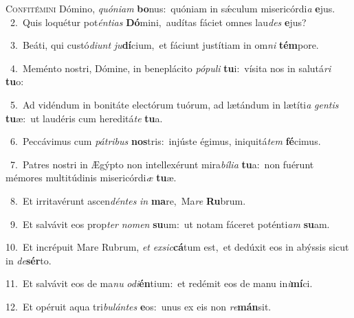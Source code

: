 \lettrine{\initial\textcolor{\initialcolor}{C}}{onfitémini} Dómino, \textit{quón}\-\textit{i}\textit{am} \textbf{bo}\-nus:~\star quóniam in sǽculum misericórdi\textit{a} \textbf{e}\-jus.\\
{\numbfont\textcolor{\numbcolor}{~2.}}~Quis loquétur pot\-\textit{én}\-\textit{ti}\textit{as} \textbf{Dó}\-mini,~\star audítas fáciet omnes lau\textit{des} \textbf{e}\-jus?\par
{\numbfont\textcolor{\numbcolor}{~3.}}~Beáti, qui custó\-\textit{di}\-\textit{unt} \textit{ju}\-\textbf{dí}cium,~\star et fáciunt justítiam in om\textit{ni} \textbf{tém}\-pore.\par
{\numbfont\textcolor{\numbcolor}{~4.}}~Meménto nostri, Dómine, in beneplácito \textit{pó}\-\textit{pu}\textit{li} \textbf{tu}\-i:~\star vísita nos in salutá\textit{ri} \textbf{tu}\-o:\par
{\numbfont\textcolor{\numbcolor}{~5.}}~Ad vidéndum in bonitáte electórum tuórum, ad lætándum in lætíti\textit{a} \textit{gen}\-\textit{tis} \textbf{tu}\-æ:~\star ut laudéris cum hereditá\textit{te} \textbf{tu}\-a.\par
{\numbfont\textcolor{\numbcolor}{~6.}}~Peccávimus cum \textit{pá}\-\textit{tri}\textit{bus} \textbf{nos}\-tris:~\star injúste égimus, iniquitá\textit{tem} \textbf{fé}\-cimus.\par
{\numbfont\textcolor{\numbcolor}{~7.}}~Patres nostri in Ægýpto non intellexérunt mira\-\textit{bí}\-\textit{li}\textit{a} \textbf{tu}\-a:~\star non fuérunt mémores multitúdinis misericórdi\textit{æ} \textbf{tu}\-æ.\par
{\numbfont\textcolor{\numbcolor}{~8.}}~Et irritavérunt ascen\-\textit{dén}\-\textit{tes} \textit{in} \textbf{ma}\-re,~\star Ma\textit{re} \textbf{Ru}\-brum.\par
{\numbfont\textcolor{\numbcolor}{~9.}}~Et salvávit eos prop\textit{ter} \textit{no}\-\textit{men} \textbf{su}\-um:~\star ut notam fáceret poténti\textit{am} \textbf{su}\-am.\par
{\numbfont\textcolor{\numbcolor}{10.}}~Et incrépuit Mare Rubrum, \textit{et} \textit{ex}\-\textit{sic}\textbf{cá}tum est,~\star et dedúxit eos in abýssis sicut in \textit{de}\-\textbf{sér}to.\par
{\numbfont\textcolor{\numbcolor}{11.}}~Et salvávit eos de ma\textit{nu} \textit{o}\-\textit{di}\textbf{én}tium:~\star et redémit eos de manu in\-\textit{i}\-\textbf{mí}ci.\par
{\numbfont\textcolor{\numbcolor}{12.}}~Et opéruit aqua tri\-\textit{bu}\-\textit{lán}\textit{tes} \textbf{e}\-os:~\star unus ex eis non \textit{re}\-\textbf{mán}sit.\par
